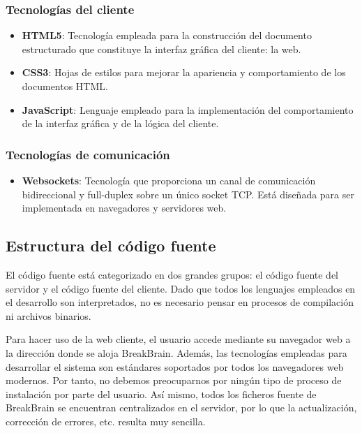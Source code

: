 \subsubsection{Tecnologías del cliente}

\begin{itemize}
\item {\bf HTML5}: Tecnología empleada para la construcción del documento estructurado que constituye la interfaz gráfica del cliente: la web.
\item {\bf CSS3}: Hojas de estilos para mejorar la apariencia y comportamiento de los documentos HTML.
\item {\bf JavaScript}: Lenguaje empleado para la implementación del comportamiento de la interfaz gráfica y de la lógica del cliente.
\end{itemize}

\subsubsection{Tecnologías de comunicación}

\begin{itemize}
\item {\bf Websockets}: Tecnología que proporciona un canal de comunicación bidireccional y full-duplex sobre un único socket TCP. Está diseñada para ser implementada en navegadores y servidores web.
\end{itemize}


\subsection{Estructura del código fuente}

El código fuente está categorizado en dos grandes grupos: el código fuente del servidor y el código fuente del cliente. Dado que todos los lenguajes empleados en el desarrollo son interpretados, no es necesario pensar en procesos de compilación ni archivos binarios.

Para hacer uso de la web cliente, el usuario accede mediante su navegador web a la dirección donde se aloja BreakBrain. Además, las tecnologías empleadas para desarrollar el sistema son estándares soportados por todos los navegadores web modernos. Por tanto, no debemos preocuparnos por ningún tipo de proceso de instalación por parte del usuario. Así mismo, todos los ficheros fuente de BreakBrain se encuentran centralizados en el servidor, por lo que la actualización, corrección de errores, etc. resulta muy sencilla.

